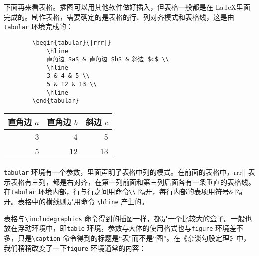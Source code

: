 下面再来看表格。插图可以用其他软件做好插入，但表格一般都是在 \LaTeX 里面完成的。制作表格，需要确定的是表格的行、列对齐模式和表格线，这是由\verb|tabular| 环境完成的：

\begin{minipage}[t]{0.45\textwidth}
    \begin{lstlisting}
        \begin{tabular}{|rrr|}
            \hline
            直角边 $a$ & 直角边 $b$ & 斜边 $c$ \\ 
            \hline
            3 & 4 & 5 \\ 
            5 & 12 & 13 \\ 
            \hline
        \end{tabular}
    \end{lstlisting}
\end{minipage}
\hfill
\begin{minipage}[t]{0.45\textwidth}
    \vspace{0.1cm}
    \hspace{0.5cm}
    \begin{tabular}{|rrr|}
        \hline
        直角边 $a$ & 直角边 $b$ & 斜边 $c$ \\ 
        \hline
        3 & 4 & 5 \\ 
        5 & 12 & 13 \\ 
        \hline
    \end{tabular}
\end{minipage}

\verb|tabular| 环境有一个参数，里面声明了表格中列的模式。在前面的表格中，\verb||rrr|| 表示表格有三列，都是右对齐，在第一列前面和第三列后面各有一条垂直的表格线。在\verb|tabular| 环境内部，行与行之间用命令\verb|\\| 隔开，每行内部的表项用符号\verb|&| 隔开。表格中的横线则是用命令 \verb|\hline| 产生的。

表格与\verb|\includegraphics| 命令得到的插图一样，都是一个比较大的盒子。一般也放在浮动环境中，即\verb|table| 环境，参数与大体的使用格式也与\verb|figure| 环境差不多，只是\verb|\caption| 命令得到的标题是“表”而不是“图”。在《杂谈勾股定理》中，我们稍稍改变了一下\verb|figure| 环境通常的内容：


